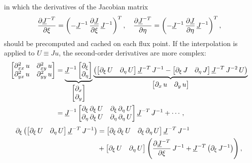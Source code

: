 \documentclass[10pt,draft]{article}
\begin{document}
in which the derivatives of the Jacobian matrix
$$
\pdv{\underline{J}^{-T}}{\xi}=\left(-\underline{J}^{-1}\,\pdv{\underline{J}}{\xi}\,\underline{J}^{-1}\right)^{T},\quad
\pdv{\underline{J}^{-T}}{\eta}=\left(-\underline{J}^{-1}\,\pdv{\underline{J}}{\eta}\,\underline{J}^{-1}\right)^{T},
$$
should be precomputed and cached on each flux point.
%
%
If the interpolation is applied to $U\equiv Ju$, the second-order derivatives are more complex:
$$
\begin{aligned}\begin{bmatrix}\partial^2_{xx}\,u & \partial^2_{xy}\,u\\
\partial^2_{yx}\,u & \partial^2_{yy}\,u
\end{bmatrix} & =\underbrace{\underline{J}^{-1}\begin{bmatrix}\partial_{\xi}\\
\partial_{\eta}
\end{bmatrix}}_{\begin{bmatrix}\partial_{x}\\
\partial_{y}
\end{bmatrix}}\underbrace{\left(\mathinner{\begin{bmatrix}\partial_{\xi}\,U & \partial_{\eta}\,U\end{bmatrix}}\underline{J}^{-T}\,J^{-1}-\mathinner{\begin{bmatrix}\partial_{\xi}\,J & \partial_{\eta}\,J\end{bmatrix}}\underline{J}^{-T}\,J^{-2}\,U\right)}_{\begin{bmatrix}\partial_{x}\,u & \partial_{y}\,u\end{bmatrix}}\\
 & =\underline{J}^{-1}\mathinner{\begin{bmatrix}\partial_{\xi}\,\partial_{\xi}\,U & \partial_{\xi}\,\partial_{\eta}\,U\\
\partial_{\eta}\,\partial_{\xi}\,U & \partial_{\eta}\,\partial_{\eta}\,U
\end{bmatrix}}\underline{J}^{-T}\,J^{-1}+\cdots,
\end{aligned}
$$
%
$$
\begin{aligned}\partial_{\xi}\left(\mathinner{\begin{bmatrix}\partial_{\xi}\,U & \partial_{\eta}\,U\end{bmatrix}}\underline{J}^{-T}\,J^{-1}\right) & =\mathinner{\begin{bmatrix}\partial_{\xi}\,\partial_{\xi}\,U & \partial_{\xi}\,\partial_{\eta}\,U\end{bmatrix}}\underline{J}^{-T}\,J^{-1}\\
 & +\mathinner{\begin{bmatrix}\partial_{\xi}\,U & \partial_{\eta}\,U\end{bmatrix}}\left(\pdv{\underline{J}^{-T}}{\xi}\,J^{-1}+\underline{J}^{-T}\left(\partial_{\xi}\,J^{-1}\right)\right),
\end{aligned}
$$
\end{document}
